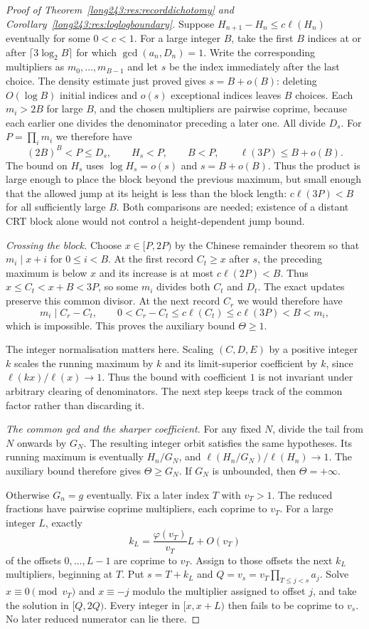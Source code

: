 \documentclass[11pt]{article}
\begin{document}
\begin{proof}[Proof of Theorem~\ref{long243:res:recorddichotomy} and
Corollary~\ref{long243:res:loglogboundary}]
Suppose $H_{n+1}-H_n\le c\ell(H_n)$ eventually for some $0<c<1$.
For a large integer $B$, take the first $B$ indices at or after
$\lceil3\log_2B\rceil$ for which $\gcd(a_n,D_n)=1$.
Write the corresponding multipliers as $m_0,\ldots,m_{B-1}$ and let
$s$ be the index immediately after the last choice. The density estimate
just proved gives $s=B+o(B)$: deleting $O(\log B)$ initial indices and
$o(s)$ exceptional indices leaves $B$ choices.
Each $m_i>2B$ for large $B$, and the chosen multipliers are pairwise
coprime, because each earlier one divides the denominator preceding a
later one. All divide $D_s$. For $P=\prod_i m_i$ we therefore have
\[
 (2B)^B<P\le D_s,\qquad H_s<P,\qquad B<P,
 \qquad \ell(3P)\le B+o(B).
\]
The bound on $H_s$ uses $\log H_s=o(s)$ and $s=B+o(B)$.
Thus the product is large enough to place the block beyond the previous
maximum, but small enough that the allowed jump at its height is less
than the block length: $c\ell(3P)<B$ for all sufficiently large $B$.
Both comparisons are needed; existence of a distant CRT block alone
would not control a height-dependent jump bound.

\emph{Crossing the block.}
Choose $x\in[P,2P)$ by the Chinese remainder theorem so that
$m_i\mid x+i$ for $0\le i<B$. At the first record $C_t\ge x$
after $s$, the preceding maximum is below $x$ and its increase is
at most $c\ell(2P)<B$. Thus
$x\le C_t<x+B<3P$, so some $m_i$ divides both $C_t$ and $D_t$.
The exact updates preserve this common divisor. At the next record
$C_r$ we would therefore have
\[
 m_i\mid C_r-C_t,\qquad
 0<C_r-C_t\le c\ell(C_t)\le c\ell(3P)<B<m_i,
\]
which is impossible. This proves the auxiliary bound $\Theta\ge1$.

The integer normalisation matters here. Scaling $(C,D,E)$ by a positive
integer $k$ scales the running maximum by $k$ and its limit-superior
coefficient by $k$, since $\ell(kx)/\ell(x)\to1$. Thus the bound with
coefficient $1$ is not invariant under arbitrary clearing of denominators.
The next step keeps track of the common factor rather than discarding it.

\emph{The common gcd and the sharper coefficient.}
For any fixed $N$, divide the tail from $N$ onwards by $G_N$.
The resulting integer orbit satisfies the same hypotheses. Its running
maximum is eventually $H_n/G_N$, and
$\ell(H_n/G_N)/\ell(H_n)\to1$. The auxiliary bound therefore gives
$\Theta\ge G_N$. If $G_N$ is unbounded, then $\Theta=+\infty$.

Otherwise $G_n=g$ eventually. Fix a later index $T$ with $v_T>1$.
The reduced fractions have pairwise coprime multipliers, each coprime
to $v_T$. For a large integer $L$, exactly
\[
 k_L=\frac{\varphi(v_T)}{v_T}L+O(v_T)
\]
of the offsets $0,\ldots,L-1$ are coprime to $v_T$.
Assign to those offsets the next $k_L$ multipliers, beginning at $T$.
Put $s=T+k_L$ and $Q=v_s=v_T\prod_{T\le j<s}a_j$.
Solve $x\equiv0\pmod{v_T}$ and $x\equiv-j$ modulo the multiplier
assigned to offset $j$, and take the solution in $[Q,2Q)$.
Every integer in $[x,x+L)$ then fails to be coprime to $v_s$.
No later reduced numerator can lie there.


\end{proof}
\end{document}
